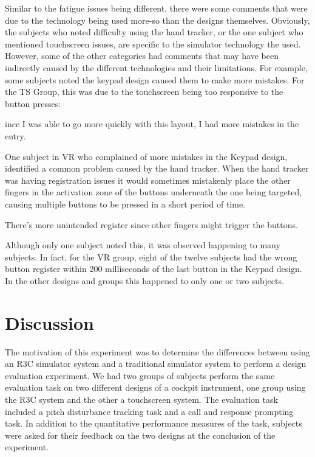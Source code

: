 Similar to the fatigue issues being different, there were some comments that were due to the technology being used more-so than the designs themselves.
Obviously, the subjects who noted difficulty using the hand tracker, or the one subject who mentioned touchscreen issues, are specific to the simulator technology the used.
However, some of the other categories had comments that may have been indirectly caused by the different technologies and their limitations.
For example, some subjects noted the keypad design caused them to make more mistakes.
For the TS Group, this was due to the touchscreen being too responsive to the button presses:
\begin{displayquote}[TS Subject]
    ince I was able to go more quickly with this layout, I had more mistakes in the entry.
\end{displayquote}
One subject in VR who complained of more mistakes in the Keypad design, identified a common problem caused by the hand tracker.
When the hand tracker was having registration issues it would sometimes mistakenly place the other fingers in the activation zone of the buttons underneath the one being targeted, causing multiple buttons to be pressed in a short period of time.
\begin{displayquote}[VR Subject]
    There's more unintended register since other fingers might trigger the buttons.
\end{displayquote}
Although only one subject noted this, it was observed happening to many subjects.
In fact, for the VR group, eight of the twelve subjects had the wrong button register within 200 milliseconds of the last button in the Keypad design.
In the other designs and groups this happened to only one or two subjects.


\section{Discussion}

The motivation of this experiment was to determine the differences between using an R3C simulator system and a traditional simulator system to perform a design evaluation experiment.
We had two groups of subjects perform the same evaluation task on two different designs of a cockpit instrument, one group using the R3C system and the other a touchscreen system.
The evaluation task included a pitch disturbance tracking task and a call and response prompting task.
In addition to the quantitative performance measures of the task, subjects were asked for their feedback on the two designs at the conclusion of the experiment.

